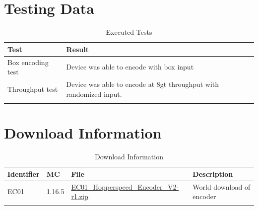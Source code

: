 \documentclass[10pt]{datasheet}
\begin{document}
\section{Testing Data}
\begin{table}[h]
\caption{Executed Tests}
\begin{tabularx}{\textwidth}{l | X}
    \thickhline
    \textbf{Test} & \textbf{Result} \\
    \hline
    Box encoding test & Device was able to encode with box input \\
    \hline
    Throughput test & Device was able to encode at 8gt throughput with randomized input. \\
    \thickhline
\end{tabularx}
\end{table}

\section{Download Information}
\begin{table}[h]
    \caption{Download Information}
    \begin{tabularx}{\textwidth}{l | l | l | X}
        \thickhline
        \textbf{Identifier} & \textbf{MC} & \textbf{File} & \textbf{Description} \\
        \hline
        EC01 & 1.16.5 & \href{https://github.com/Soontech-Annals/Archive/blob/92d3541e07ddc3ab90360e923907f040eca76834/Archive/encoders/EC01\%20Hopperspeed\%20Encoder\%20V2/EC01\_Hopperspeed\_Encoder\_V2-r1.zip?raw=1}{EC01\_Hopperspeed\_Encoder\_V2-r1.zip} & World download of encoder \\
        \hline
        \thickhline
    \end{tabularx}
\end{table}
\end{document}
